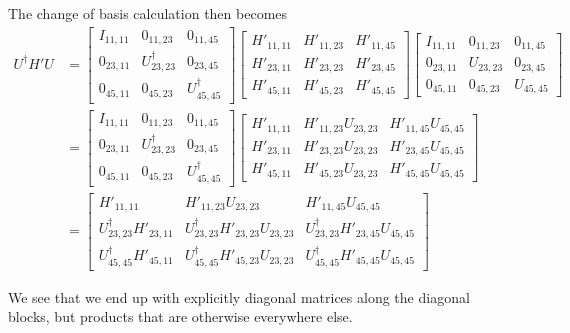 The change of basis calculation then becomes
\begin{align*}
U^\dagger H' U
&=
\begin{bmatrix}
I_{11,11} & 0_{11, 23} & 0_{11,45} \\
0_{23,11} & U_{23, 23}^\dagger & 0_{23,45} \\
0_{45,11} & 0_{45, 23} & U_{45,45}^\dagger
\end{bmatrix}
\begin{bmatrix}
{H'}_{11,11} & {H'}_{11, 23} & {H'}_{11,45} \\
{H'}_{23,11} & {H'}_{23, 23} & {H'}_{23,45} \\
{H'}_{45,11} & {H'}_{45, 23} & {H'}_{45,45} 
\end{bmatrix} 
\begin{bmatrix}
I_{11,11} & 0_{11, 23} & 0_{11,45} \\
0_{23,11} & U_{23, 23} & 0_{23,45} \\
0_{45,11} & 0_{45, 23} & U_{45,45} 
\end{bmatrix} \\
&=
\begin{bmatrix}
I_{11,11} & 0_{11, 23} & 0_{11,45} \\
0_{23,11} & U_{23, 23}^\dagger & 0_{23,45} \\
0_{45,11} & 0_{45, 23} & U_{45,45}^\dagger
\end{bmatrix}
\begin{bmatrix}
{H'}_{11,11} & {H'}_{11, 23} U_{23, 23} & {H'}_{11,45} U_{45, 45} \\
{H'}_{23,11} & {H'}_{23, 23} U_{23, 23} & {H'}_{23,45} U_{45, 45} \\
{H'}_{45,11} & {H'}_{45, 23} U_{23, 23} & {H'}_{45,45} U_{45, 45} 
\end{bmatrix} \\
&=
\begin{bmatrix}
\boxed{{H'}_{11,11}} & {H'}_{11, 23} U_{23, 23} & {H'}_{11,45} U_{45, 45} \\
U_{23, 23}^\dagger {H'}_{23,11} & \boxed{U_{23, 23}^\dagger {H'}_{23, 23} U_{23, 23}} & U_{23, 23}^\dagger {H'}_{23,45} U_{45, 45} \\
U_{45, 45}^\dagger {H'}_{45,11} & U_{45, 45}^\dagger {H'}_{45, 23} U_{23, 23} & \boxed{U_{45, 45}^\dagger {H'}_{45,45} U_{45, 45} }
\end{bmatrix} 
\end{align*}

We see that we end up with explicitly diagonal matrices along the diagonal blocks, but products that are otherwise everywhere else.

